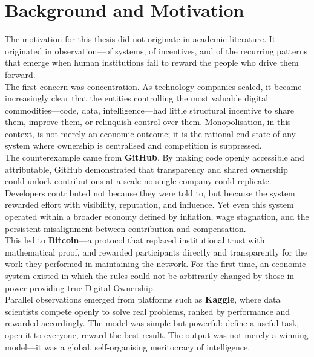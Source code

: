 \documentclass[12pt, a4paper, oneside]{report}
\theoremstyle{definition}
\begin{document}
\chapter*{Background and Motivation}


The motivation for this thesis did not originate in academic literature. It originated 
in observation—of systems, of incentives, and of the recurring patterns that emerge 
when human institutions fail to reward the people who drive them forward.\\

The first concern was concentration. As technology companies scaled, it became 
increasingly clear that the entities controlling the most valuable digital 
commodities—code, data, intelligence—had little structural incentive to share 
them, improve them, or relinquish control over them. Monopolisation, in this 
context, is not merely an economic outcome; it is the rational end-state of 
any system where ownership is centralised and competition is suppressed.\\

The counterexample came from \textbf{GitHub}. By making code openly accessible 
and attributable, GitHub demonstrated that transparency and shared ownership 
could unlock contributions at a scale no single company could replicate. 
Developers contributed not because they were told to, but because the system 
rewarded effort with visibility, reputation, and influence. Yet even this 
system operated within a broader economy defined by inflation, wage stagnation, 
and the persistent misalignment between contribution and compensation.\\

This led to \textbf{Bitcoin}—a protocol that replaced institutional trust with 
mathematical proof, and rewarded participants directly and transparently for 
the work they performed in maintaining the network. For the first time, an 
economic system existed in which the rules could not be arbitrarily changed 
by those in power providing true Digital Ownership.\\

Parallel observations emerged from platforms such as \textbf{Kaggle}, where 
data scientists compete openly to solve real problems, ranked by performance 
and rewarded accordingly. The model was simple but powerful: define a useful 
task, open it to everyone, reward the best result. The output was not merely 
a winning model—it was a global, self-organising meritocracy of intelligence.\\
\end{document}
